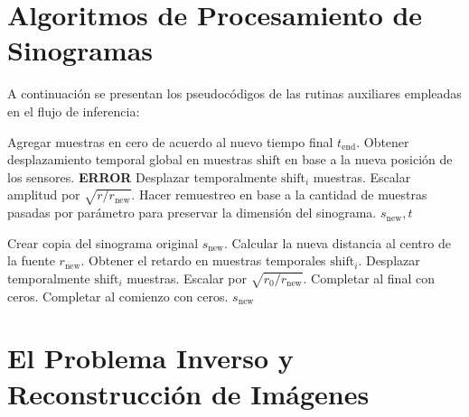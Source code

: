 \section{Algoritmos de Procesamiento de Sinogramas}

A continuación se presentan los pseudocódigos de las rutinas auxiliares empleadas en el flujo de inferencia:

\begin{algorithm}[H]
\caption{Extensión de sinograma}
\label{alg:extension_sinograma}
\begin{algorithmic}
\STATE Agregar muestras en cero de acuerdo al nuevo tiempo final $t_{\text{end}}$.
\STATE Obtener desplazamiento temporal global en muestras $\text{shift}$ en base a la nueva posición de los sensores.
    \STATE \textbf{ERROR}
\ENDIF
\STATE Desplazar temporalmente $\text{shift}_i$ muestras.
\STATE Escalar amplitud por $\sqrt{r / r_{\text{new}}}$.
    \STATE Hacer remuestreo en base a la cantidad de muestras pasadas por parámetro para preservar la dimensión del sinograma.
\ENDIF
\RETURN $s_{\text{new}}, t$
\end{algorithmic}
\end{algorithm}

\begin{algorithm}[H]
\caption{Desplazamiento de sinograma}
\label{alg:desplazamiento_sinograma}
\begin{algorithmic}
\STATE Crear copia del sinograma original $s_{\text{new}}$.
    \STATE Calcular la nueva distancia al centro de la fuente $r_{\text{new}}$.
    \STATE Obtener el retardo en muestras temporales $\text{shift}_i$.
    \STATE Desplazar temporalmente $\text{shift}_i$ muestras.
    \STATE Escalar por $\sqrt{r_0 / r_{\text{new}}}$.
        \STATE Completar al final con ceros.
    \ELSE
        \STATE Completar al comienzo con ceros.
    \ENDIF
\ENDFOR
\RETURN $s_{\text{new}}$
\end{algorithmic}
\end{algorithm}




\section{El Problema Inverso y Reconstrucción de Imágenes}

